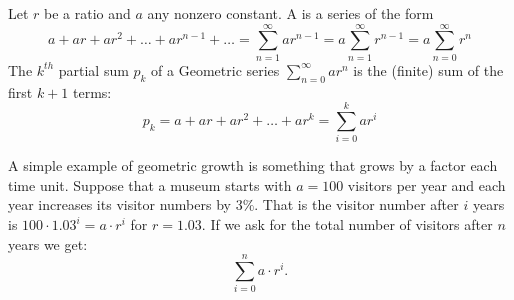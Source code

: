 \begin{defn}
Let $r$ be a ratio and $a$ any nonzero constant. A 
is a series of the form
\[
a+ ar + ar^{2}+ \ldots + ar^{n-1}+ \ldots = \sum_{n=1}^{\infty}
ar^{n-1} =a\sum_{n=1}^\infty r^{n-1}=a\sum_{n=0}^\infty r^n
\]
The $k^{th}$ partial sum $p_{k}$ of a Geometric series
$\displaystyle{\sum_{n=0}^{\infty} ar^{n}}$ is the (finite) sum of
the first $k+1$ terms:
\[
p_{k} = a + ar + ar^{2} + \ldots + ar^k =
\sum_{i=0}^k ar^{i}
\]
\end{defn}

A simple example of geometric growth is something that grows by a factor
each time unit. Suppose that a museum starts with
$a=100$ visitors per year and each year increases its visitor numbers by
$3\%$. That is the visitor number after $i$ years is $100\cdot 1.03^i=a\cdot
r^i$ for $r=1.03$. 
If we ask for the total number of visitors after $n$ years we get:
\[
\sum_{i=0}^n a\cdot r^i.
\]

%
%

